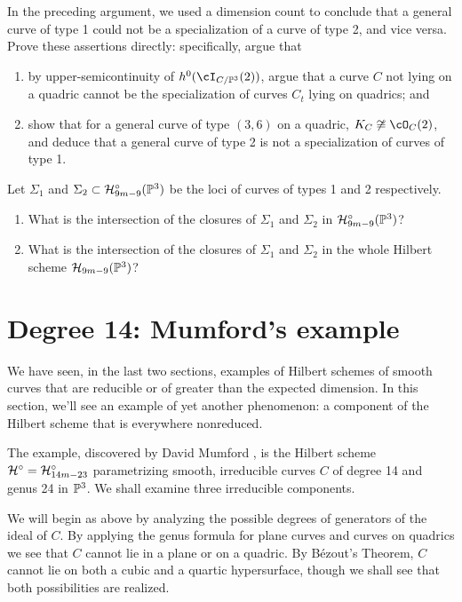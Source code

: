 \begin{exercise}
In the preceding argument, we used a dimension count to conclude that a general curve of type 1 could not be a specialization of a curve of type 2, and vice versa. Prove these assertions directly: specifically, argue that
\begin{enumerate}
\item by upper-semicontinuity of $h^0(\cI_{C/\PP^3}(2))$, argue that a curve $C$ not lying on a quadric cannot be the specialization of curves $C_t$ lying on quadrics; and
\item show that for a general curve of type $(3,6)$ on a quadric, $K_C \not\cong \cO_C(2)$, and deduce that a general curve of type 2 is not a specialization of curves of type 1.
\end{enumerate}
\end{exercise}

\begin{exercise}
Let $\Sigma_1$ and $\Sigma_2 \subset \cH^\circ_{9m-9}(\PP^3)$ be the loci of curves of types 1 and 2 respectively. 
\begin{enumerate}
\item What is the intersection of the closures of $\Sigma_1$ and $\Sigma_2$ in $\cH^\circ_{9m-9}(\PP^3)$?
\item What is the intersection of the closures of $\Sigma_1$ and $\Sigma_2$ in the whole Hilbert scheme $\cH_{9m-9}(\PP^3)$?
\end{enumerate}
\end{exercise}

 

\section{Degree 14: Mumford's example}\label{mumford example}

We have seen, in the last two sections, examples of Hilbert schemes of smooth curves that are reducible or of greater than the expected dimension. In this section, we'll see an example of yet another phenomenon: a component of the Hilbert scheme that is everywhere nonreduced. 

The example, discovered by David Mumford \cite{****}, is the  Hilbert scheme
$\cH^\circ = \cH^\circ_{14m-23}$ parametrizing smooth, irreducible curves $C$ of degree 14 and genus 24 in $\PP^3$. We shall examine three irreducible components. 

We will begin as above by analyzing the possible degrees of generators of the ideal of $C$. By applying the genus formula for plane curves and curves on quadrics we see that $C$ cannot lie in a plane or on a quadric. By B\'ezout's Theorem, $C$ cannot lie on both a cubic and a quartic hypersurface, though we shall see that both possibilities are realized.

